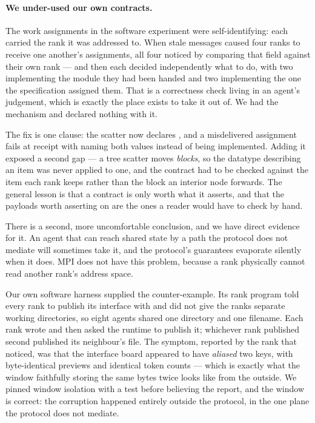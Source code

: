 \paragraph{We under-used our own contracts.} The work assignments in the
software experiment were self-identifying: each carried the rank it was
addressed to. When stale messages caused four ranks to receive one another's
assignments, all four noticed by comparing that field against their own rank
--- and then each decided independently what to do, with two implementing
the module they had been handed and two implementing the one the
specification assigned them. That is a correctness check living in an
agent's judgement, which is exactly the place  exists to
take it out of. We had the mechanism and declared nothing with it.

The fix is one clause: the scatter now declares
, and a misdelivered assignment fails at
receipt with  naming both values instead of being
implemented. Adding it exposed a second gap --- a tree scatter moves
\emph{blocks}, so the datatype describing an item was never applied to one,
and the contract had to be checked against the item each rank keeps rather
than the block an interior node forwards. The general lesson is that a
contract is only worth what it asserts, and that the payloads worth
asserting on are the ones a reader would have to check by hand.

There is a second, more uncomfortable conclusion, and we have direct
evidence for it. An agent that can reach shared state by a path the protocol
does not mediate will sometimes take it, and the protocol's guarantees
evaporate silently when it does. MPI does not have this problem, because a
rank physically cannot read another rank's address space.

Our own software harness supplied the counter-example. Its rank program told
every rank to publish its interface with  and did
not give the ranks separate working directories, so eight agents shared one
directory and one filename. Each rank wrote  and then asked
the runtime to publish it; whichever rank published second published its
neighbour's file. The symptom, reported by the rank that noticed, was that
the interface board appeared to have \emph{aliased} two keys, with
byte-identical previews and identical token counts --- which is exactly what
the window faithfully storing the same bytes twice looks like from the
outside. We pinned window isolation with a test before believing the report,
and the window is correct: the corruption happened entirely outside the
protocol, in the one plane the protocol does not mediate.

